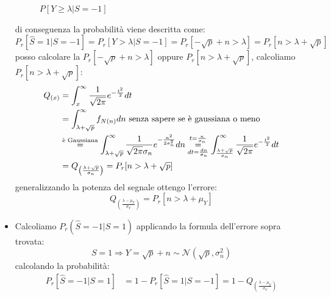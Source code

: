 \begin{itemize}
{\begin{figure}[H]
                        \caption{{\color{red}$P[Y\geq \lambda|S=-1]$}}
                    \end{figure}               
                    di conseguenza la probabilità viene descritta come:
                    \[
                        P_r[\hat{S} = 1|S=-1] = P_r[Y> \lambda|S=-1] = P_r[-\sqrt{p}+n > \lambda] =P_r[n > \lambda+\sqrt{p}]
                    \]
                    posso calcolare la $P_r[-\sqrt{p}+n > \lambda]$ oppure $P_r[n > \lambda+\sqrt{p}]$, calcoliamo $P_r[n > \lambda+\sqrt{p}]$:
                    \begin{align}
                        Q_{(x)} &= \int_{x}^{\infty} \frac{1}{\sqrt{2\pi}} e^{-\frac{t^2}{2}}dt\nonumber \\
                                &= \int_{\lambda+\sqrt{p}}^{\infty}f_{N(n)}dn\text{ senza sapere se è gaussiana o meno}\nonumber \\
                                &\overset{\text{è Gaussiana}}{=} \int_{\lambda+\sqrt{p}}^{\infty}\frac{1}{\sqrt{2\pi}\sigma_n}e^{-\frac{n^2}{2\sigma_n^2}}dn \overunderset{t = \frac{n}{\sigma_n}}{dt = \frac{dn}{\sigma_n}}{=} \int_{\frac{\lambda+\sqrt{p}}{\sigma_n}}^{\infty}\frac{1}{\sqrt{2\pi}}e^{-\frac{t^2}{2}}dt\nonumber \\
                                &= Q_{\left(\frac{\lambda +\sqrt{p}}{\sigma_n}\right)} = P_r[n>\lambda + \sqrt{p}]\nonumber 
                    \end{align}
                    generalizzando la potenza del segnale ottengo l'errore:
                    \[
                        Q_{\displaystyle\left(\frac{\lambda -\mu_Y}{\sigma_Y}\right)} = P_r[n>\lambda + \mu_Y]
                    \]
                }
                \item {Calcoliamo ${P_r(\hat{S}=-1|S=1)}$ applicando la formula dell'errore sopra trovata:
                    \[
                        S=1\Rightarrow Y = \sqrt{p}+n\sim\mathcal{N}(\sqrt{p},\sigma_n^2)  
                    \]
                    calcolando la probabilità:
                    \begin{align}
                        P_r[\hat{S}=-1|S=1] &= 1-P_r[\hat{S}=1|S=-1] = 1- Q_{\displaystyle\left(\frac{\lambda -\mu_Y}{\sigma_Y}\right)}  \nonumber \\

\end{align}}
\end{itemize}
